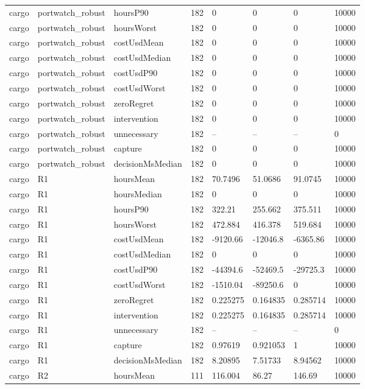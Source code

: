 \begin{tabular}{llllllll}
cargo & portwatch\_robust & hoursP90 & 182 & 0 & 0 & 0 & 10000 \\
cargo & portwatch\_robust & hoursWorst & 182 & 0 & 0 & 0 & 10000 \\
cargo & portwatch\_robust & costUsdMean & 182 & 0 & 0 & 0 & 10000 \\
cargo & portwatch\_robust & costUsdMedian & 182 & 0 & 0 & 0 & 10000 \\
cargo & portwatch\_robust & costUsdP90 & 182 & 0 & 0 & 0 & 10000 \\
cargo & portwatch\_robust & costUsdWorst & 182 & 0 & 0 & 0 & 10000 \\
cargo & portwatch\_robust & zeroRegret & 182 & 0 & 0 & 0 & 10000 \\
cargo & portwatch\_robust & intervention & 182 & 0 & 0 & 0 & 10000 \\
cargo & portwatch\_robust & unnecessary & 182 & -- & -- & -- & 0 \\
cargo & portwatch\_robust & capture & 182 & 0 & 0 & 0 & 10000 \\
cargo & portwatch\_robust & decisionMsMedian & 182 & 0 & 0 & 0 & 10000 \\
cargo & R1 & hoursMean & 182 & 70.7496 & 51.0686 & 91.0745 & 10000 \\
cargo & R1 & hoursMedian & 182 & 0 & 0 & 0 & 10000 \\
cargo & R1 & hoursP90 & 182 & 322.21 & 255.662 & 375.511 & 10000 \\
cargo & R1 & hoursWorst & 182 & 472.884 & 416.378 & 519.684 & 10000 \\
cargo & R1 & costUsdMean & 182 & -9120.66 & -12046.8 & -6365.86 & 10000 \\
cargo & R1 & costUsdMedian & 182 & 0 & 0 & 0 & 10000 \\
cargo & R1 & costUsdP90 & 182 & -44394.6 & -52469.5 & -29725.3 & 10000 \\
cargo & R1 & costUsdWorst & 182 & -1510.04 & -89250.6 & 0 & 10000 \\
cargo & R1 & zeroRegret & 182 & 0.225275 & 0.164835 & 0.285714 & 10000 \\
cargo & R1 & intervention & 182 & 0.225275 & 0.164835 & 0.285714 & 10000 \\
cargo & R1 & unnecessary & 182 & -- & -- & -- & 0 \\
cargo & R1 & capture & 182 & 0.97619 & 0.921053 & 1 & 10000 \\
cargo & R1 & decisionMsMedian & 182 & 8.20895 & 7.51733 & 8.94562 & 10000 \\
cargo & R2 & hoursMean & 111 & 116.004 & 86.27 & 146.69 & 10000 \\

\end{tabular}
